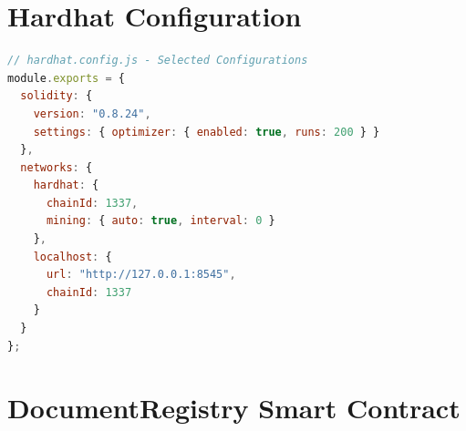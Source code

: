 \section{Hardhat Configuration}
\label{appendix:hardhat_config}
\begin{lstlisting}[language=javascript]
// hardhat.config.js - Selected Configurations
module.exports = {
  solidity: {
    version: "0.8.24",
    settings: { optimizer: { enabled: true, runs: 200 } }
  },
  networks: {
    hardhat: {
      chainId: 1337,
      mining: { auto: true, interval: 0 }
    },
    localhost: {
      url: "http://127.0.0.1:8545",
      chainId: 1337
    }
  }
};

\end{lstlisting}

\section{DocumentRegistry Smart Contract}
\label{appendix:smartcontract}

